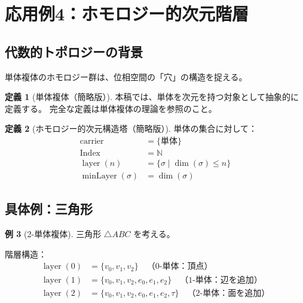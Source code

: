 \documentclass[a4paper,12pt]{ltjsarticle}
\theoremstyle{definition}
\newtheorem{definition}{定義}[section]
\newtheorem{example}[definition]{例}
\newcommand{\N}{\mathbb{N}}
\DeclareMathOperator{\layer}{layer}
\DeclareMathOperator{\minLayer}{minLayer}
\begin{document}
\section{応用例4：ホモロジー的次元階層}

\subsection{代数的トポロジーの背景}

単体複体のホモロジー群は、位相空間の「穴」の構造を捉える。

\begin{definition}[単体複体（簡略版）]
本稿では、単体を次元を持つ対象として抽象的に定義する。
完全な定義は単体複体の理論を参照のこと。
\end{definition}

\begin{definition}[ホモロジー的次元構造塔（簡略版）]
単体の集合に対して：
\begin{align*}
\mathrm{carrier} &= \{\text{単体}\} \\
\mathrm{Index} &= \N \\
\layer(n) &= \{\sigma \mid \dim(\sigma) \leq n\} \\
\minLayer(\sigma) &= \dim(\sigma)
\end{align*}
\end{definition}

\subsection{具体例：三角形}

\begin{example}[2-単体複体]
三角形 $\triangle ABC$ を考える。

\begin{center}
\end{center}

階層構造：
\begin{align*}
\layer(0) &= \{v_0, v_1, v_2\} \quad \text{（0-単体：頂点）} \\
\layer(1) &= \{v_0, v_1, v_2, e_0, e_1, e_2\} \quad \text{（1-単体：辺を追加）} \\
\layer(2) &= \{v_0, v_1, v_2, e_0, e_1, e_2, \tau\} \quad \text{（2-単体：面を追加）}
\end{align*}
\end{example}
\end{document}

